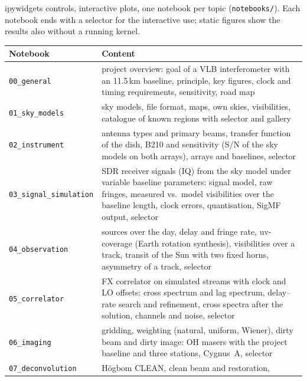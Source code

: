 
ipywidgets controls, interactive plots, one notebook per topic
(\texttt{notebooks/}). Each notebook ends with a selector for the
interactive use; static figures show the results also without a running
kernel.

\begin{center}
\begin{tabular}{@{}l>{\raggedright\arraybackslash}p{9.6cm}@{}}
\toprule
Notebook & Content \\
\midrule
\texttt{00\_general} & project overview: goal of a VLB interferometer
  with an 11.5\,km baseline, principle, key figures, clock and timing
  requirements, sensitivity, road map \\
\texttt{01\_sky\_models} & sky models, file format, maps, own skies,
  visibilities, catalogue of known regions with selector and gallery \\
\texttt{02\_instrument} & antenna types and primary beams, transfer
  function of the dish, B210 and sensitivity (S/N of the sky models on
  both arrays), arrays and baselines, selector \\
\texttt{03\_signal\_simulation} & SDR receiver signals (IQ) from the sky
  model under variable baseline parameters: signal model, raw fringes,
  measured vs.\ model visibilities over the baseline length, clock errors,
  quantisation, SigMF output, selector \\
\texttt{04\_observation} & sources over the day, delay and fringe rate,
  uv-coverage (Earth rotation synthesis), visibilities over a track,
  transit of the Sun with two fixed horns, asymmetry of a track, selector \\
\texttt{05\_correlator} & FX correlator on simulated streams with clock
  and LO offsets: cross spectrum and lag spectrum, delay--rate search and
  refinement, cross spectra after the solution, channels and noise,
  selector \\
\texttt{06\_imaging} & gridding, weighting (natural, uniform, Wiener),
  dirty beam and dirty image: OH masers with the project baseline and three
  stations, Cygnus~A, selector \\
\texttt{07\_deconvolution} & H\"ogbom CLEAN, clean beam and restoration,

\end{tabular}
\end{center}
